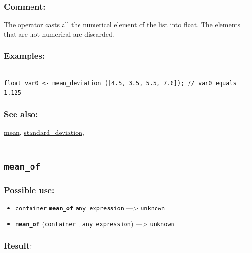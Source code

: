 \documentclass[]{book}
\providecommand{\tightlist}{%
  \setlength{\itemsep}{0pt}\setlength{\parskip}{0pt}}
\theoremstyle{definition}
\theoremstyle{definition}
\theoremstyle{definition}
\theoremstyle{remark}
\begin{document}
\subsubsection{Comment:}\label{comment-68}

The operator casts all the numerical element of the list into float. The
elements that are not numerical are discarded.

\subsubsection{Examples:}\label{examples-237}

\begin{verbatim}
 
float var0 <- mean_deviation ([4.5, 3.5, 5.5, 7.0]); // var0 equals 1.125
\end{verbatim}

\subsubsection{See also:}\label{see-also-138}

\href{operators-i-to-m.html\#mean}{mean},
\href{operators-s-to-z.html\#standard_deviation}{standard\_deviation},

\begin{center}\rule{0.5\linewidth}{\linethickness}\end{center}

\subsection{\texorpdfstring{\texttt{mean\_of}}{mean\_of}}\label{mean_of}

\subsubsection{Possible use:}\label{possible-use-345}

\begin{itemize}
\tightlist
\item
  \texttt{container} \textbf{\texttt{mean\_of}} \texttt{any\ expression}
  ---\textgreater{} \texttt{unknown}
\item
  \textbf{\texttt{mean\_of}} (\texttt{container} ,
  \texttt{any\ expression}) ---\textgreater{} \texttt{unknown}
\end{itemize}

\subsubsection{Result:}\label{result-334}
\end{document}
